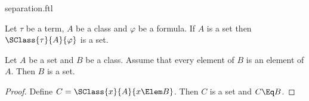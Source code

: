 \documentclass{stex}
\begin{document}
\begin{smodule}{separation.ftl}


\begin{fakeforthel}
  \begin{axiom}
    Let $\tau$ be a term, $A$ be a class and $\varphi$ be a formula.
    If $A$ is a set then $\SClass{\tau}{A}{\varphi}$ is a set.
  \end{axiom}
\end{fakeforthel}

\begin{forthel}
  \begin{corollary}
    Let $A$ be a set and $B$ be a class.
    Assume that every element of $B$ is an element of $A$.
    Then $B$ is a set.
  \end{corollary}
  \begin{proof}
    Define $C = \SClass{x}{A}{x \Elem B}$.
    Then $C$ is a set and $C \Eq B$.
  \end{proof}
\end{forthel}

\end{smodule}
\end{document}
